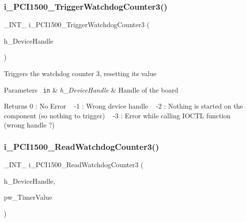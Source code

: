 \subsubsection{\texorpdfstring{i\_PCI1500\_TriggerWatchdogCounter3()}{i\_PCI1500\_TriggerWatchdogCounter3()}}
{\footnotesize\ttfamily \+\_\+\+I\+N\+T\+\_\+ i\+\_\+\+P\+C\+I1500\+\_\+\+Trigger\+Watchdog\+Counter3 (\begin{DoxyParamCaption}\item[{H\+A\+N\+D\+LE}]{h\+\_\+\+Device\+Handle }\end{DoxyParamCaption})}

Triggers the watchdog counter 3, resetting its value


\begin{DoxyParams}[1]{Parameters}
\mbox{\texttt{ in}}  & {\em h\+\_\+\+Device\+Handle} & Handle of the board\\
\hline
\end{DoxyParams}
\begin{DoxyReturn}{Returns}
0 \+: No Error ~\newline
 -\/1 \+: Wrong device handle ~\newline
 -\/2 \+: Nothing is started on the component (so nothing to trigger) ~\newline
 -\/3 \+: Error while calling I\+O\+C\+TL function (wrong handle ?) ~\newline

\end{DoxyReturn}
\mbox{\label{group___timer3_ga5e6aec1589c8c085ffe0028f6bf01811}} 
\subsubsection{\texorpdfstring{i\_PCI1500\_ReadWatchdogCounter3()}{i\_PCI1500\_ReadWatchdogCounter3()}}
{\footnotesize\ttfamily \+\_\+\+I\+N\+T\+\_\+ i\+\_\+\+P\+C\+I1500\+\_\+\+Read\+Watchdog\+Counter3 (\begin{DoxyParamCaption}\item[{H\+A\+N\+D\+LE}]{h\+\_\+\+Device\+Handle,  }\item[{P\+W\+O\+RD}]{pw\+\_\+\+Timer\+Value }\end{DoxyParamCaption})}

